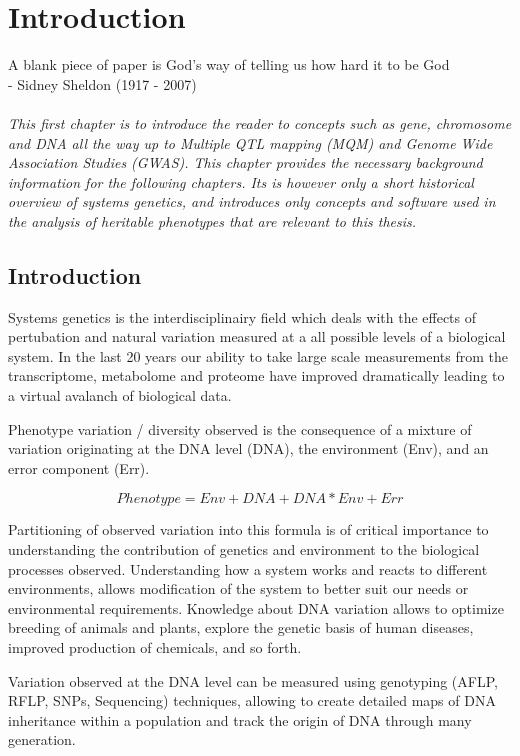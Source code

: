 \chapter{Introduction}
\label{chap:introduction}
A blank piece of paper is God's way of telling us how hard it to be God\\
- Sidney Sheldon (1917 - 2007)\\\\

\emph{This first chapter is to introduce the reader to concepts such as gene, chromosome 
and DNA all the way up to Multiple QTL mapping (MQM) and Genome Wide Association Studies 
(GWAS). This chapter provides the necessary background information for the following 
chapters. Its is however only a short historical overview of systems genetics, and 
introduces only concepts and software used in the analysis of heritable phenotypes that 
are relevant to this thesis. }

\null
\vfill
\newpage

\section{Introduction}
Systems genetics is the interdisciplinairy field which deals with the effects of 
pertubation and natural variation measured at a all possible levels of a biological 
system. In the last 20 years our ability to take large scale measurements from the 
transcriptome, metabolome and proteome have improved dramatically leading to a virtual 
avalanch of biological data.

Phenotype variation / diversity observed is the consequence of a mixture of variation 
originating at the DNA level (DNA), the environment (Env), and an error component (Err).

$$ Phenotype = Env + DNA + DNA * Env + Err $$

Partitioning of observed variation into this formula is of critical importance 
to understanding the contribution of genetics and environment to the biological 
processes observed. Understanding how a system works and reacts to different 
environments, allows modification of the system to better suit our needs or 
environmental requirements. Knowledge about DNA variation allows to optimize 
breeding of animals and plants, explore the genetic basis of human diseases, 
improved production of chemicals, and so forth.

Variation observed at the DNA level can be measured using genotyping (AFLP, RFLP, 
SNPs, Sequencing) techniques, allowing to create detailed maps of DNA inheritance 
within a population and track the origin of DNA through many generation.


